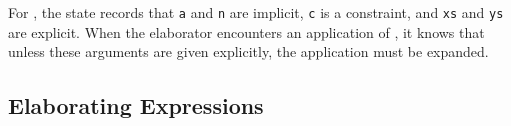 \noindent
For , the state records that \texttt{a} and \texttt{n} are implicit, 
\texttt{c} is a constraint, and \texttt{xs} and \texttt{ys} are explicit. When
the elaborator encounters an application of , it knows that unless these arguments
are given explicitly, the application must be expanded.

\subsection{Elaborating Expressions}

\newcommand{\piimp}[2]{\mbox{\texttt{\{ $#1$ : $#2$ \} -> }}}
\newcommand{\piexp}[2]{\mbox{\texttt{( $#1$ : $#2$ ) -> }}}
\newcommand{\piconst}[1]{\mbox{\texttt{$#1$ => }}}
\newcommand{\icase}{\mathtt{case}}
\newcommand{\iwith}{\mathtt{with}}
\newcommand{\idata}{\mathtt{data}}
\newcommand{\iclass}{\mathtt{class}}
\newcommand{\iinstance}{\mathtt{instance}}
\newcommand{\iwhere}{\mathtt{where}}
\newcommand{\iof}{\mathtt{of}}
\newcommand{\ilet}[2]{\mathtt{let}\;#1\;\mathtt{=}\;#2\;\mathtt{in}}
\newcommand{\ilam}[1]{\mathtt{\backslash}\;#1\;\mathtt{=>}}
\newcommand{\iarg}[2]{\mbox{\texttt{\{$#1$ = $#2$\}}}}
\newcommand{\ihab}[2]{\mbox{\texttt{$#1$ : $#2$}}}
\newcommand{\carg}[1]{\mbox{\texttt{\{\{$#1$\}\}}}}
\newcommand{\fatarrow}{\mbox{\texttt{=>}}}
\newcommand{\ibar}{\mbox{\texttt{|}}}
\newcommand{\mvar}[1]{\mbox{\texttt{?}}#1}


